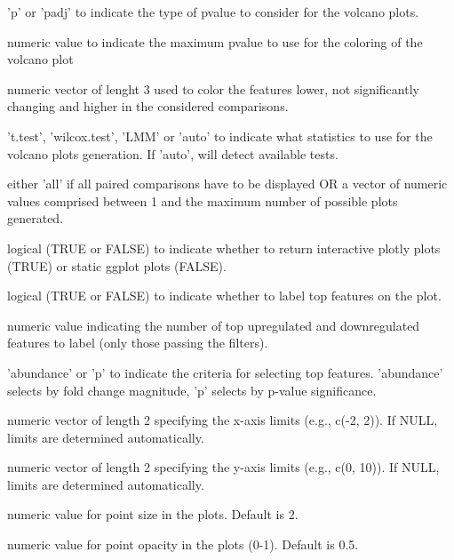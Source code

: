 \documentclass[a4paper]{book}
\begin{document}
%
\begin{Arguments}
\begin{ldescription}
\item[\code{p\_type}] 'p' or 'padj' to indicate the type of pvalue to consider for the volcano plots.

\item[\code{p}] numeric value to indicate the maximum pvalue to use for the coloring of the volcano plot

\item[\code{colors}] numeric vector of lenght 3 used to color the features lower, not significantly changing and higher in the considered comparisons.

\item[\code{stat\_type}] 't.test', 'wilcox.test', 'LMM' or 'auto' to indicate what statistics to use for the volcano plots generation. If 'auto', will detect available tests.

\item[\code{plot}] either 'all' if all paired comparisons have to be displayed OR a vector of numeric values comprised between 1 and the maximum number of possible plots generated.

\item[\code{plotly}] logical (TRUE or FALSE) to indicate whether to return interactive plotly plots (TRUE) or static ggplot plots (FALSE).

\item[\code{label\_features}] logical (TRUE or FALSE) to indicate whether to label top features on the plot.

\item[\code{top\_features}] numeric value indicating the number of top upregulated and downregulated features to label (only those passing the filters).

\item[\code{top\_features\_by}] 'abundance' or 'p' to indicate the criteria for selecting top features. 'abundance' selects by fold change magnitude, 'p' selects by p-value significance.

\item[\code{xlim}] numeric vector of length 2 specifying the x-axis limits (e.g., c(-2, 2)). If NULL, limits are determined automatically.

\item[\code{ylim}] numeric vector of length 2 specifying the y-axis limits (e.g., c(0, 10)). If NULL, limits are determined automatically.

\item[\code{size}] numeric value for point size in the plots. Default is 2.

\item[\code{alpha}] numeric value for point opacity in the plots (0-1). Default is 0.5.
\end{ldescription}
\end{Arguments}
\end{document}
